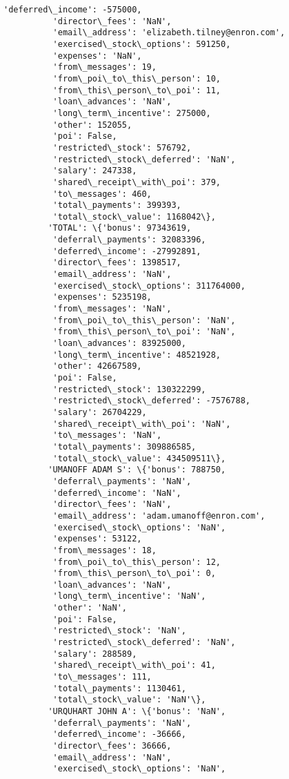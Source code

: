 \documentclass[11pt]{article}
\begin{document}
\begin{Verbatim}[commandchars=\\\{\}]
          'deferred\_income': -575000,
          'director\_fees': 'NaN',
          'email\_address': 'elizabeth.tilney@enron.com',
          'exercised\_stock\_options': 591250,
          'expenses': 'NaN',
          'from\_messages': 19,
          'from\_poi\_to\_this\_person': 10,
          'from\_this\_person\_to\_poi': 11,
          'loan\_advances': 'NaN',
          'long\_term\_incentive': 275000,
          'other': 152055,
          'poi': False,
          'restricted\_stock': 576792,
          'restricted\_stock\_deferred': 'NaN',
          'salary': 247338,
          'shared\_receipt\_with\_poi': 379,
          'to\_messages': 460,
          'total\_payments': 399393,
          'total\_stock\_value': 1168042\},
         'TOTAL': \{'bonus': 97343619,
          'deferral\_payments': 32083396,
          'deferred\_income': -27992891,
          'director\_fees': 1398517,
          'email\_address': 'NaN',
          'exercised\_stock\_options': 311764000,
          'expenses': 5235198,
          'from\_messages': 'NaN',
          'from\_poi\_to\_this\_person': 'NaN',
          'from\_this\_person\_to\_poi': 'NaN',
          'loan\_advances': 83925000,
          'long\_term\_incentive': 48521928,
          'other': 42667589,
          'poi': False,
          'restricted\_stock': 130322299,
          'restricted\_stock\_deferred': -7576788,
          'salary': 26704229,
          'shared\_receipt\_with\_poi': 'NaN',
          'to\_messages': 'NaN',
          'total\_payments': 309886585,
          'total\_stock\_value': 434509511\},
         'UMANOFF ADAM S': \{'bonus': 788750,
          'deferral\_payments': 'NaN',
          'deferred\_income': 'NaN',
          'director\_fees': 'NaN',
          'email\_address': 'adam.umanoff@enron.com',
          'exercised\_stock\_options': 'NaN',
          'expenses': 53122,
          'from\_messages': 18,
          'from\_poi\_to\_this\_person': 12,
          'from\_this\_person\_to\_poi': 0,
          'loan\_advances': 'NaN',
          'long\_term\_incentive': 'NaN',
          'other': 'NaN',
          'poi': False,
          'restricted\_stock': 'NaN',
          'restricted\_stock\_deferred': 'NaN',
          'salary': 288589,
          'shared\_receipt\_with\_poi': 41,
          'to\_messages': 111,
          'total\_payments': 1130461,
          'total\_stock\_value': 'NaN'\},
         'URQUHART JOHN A': \{'bonus': 'NaN',
          'deferral\_payments': 'NaN',
          'deferred\_income': -36666,
          'director\_fees': 36666,
          'email\_address': 'NaN',
          'exercised\_stock\_options': 'NaN',

\end{Verbatim}
\end{document}

